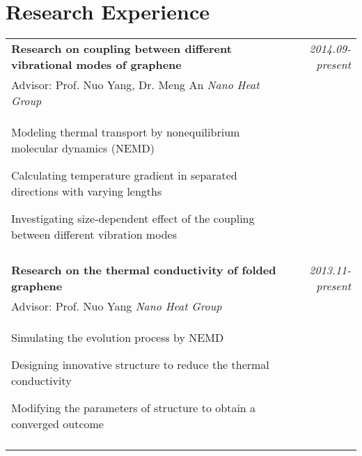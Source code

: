 \documentclass[a4paper,10pt]{article}
\begin{document}
\section{Research Experience}
\begin{tabular}{p{14.5cm}r}
\textbf{Research on coupling between different vibrational modes of graphene} & \emph{2014.09-present} \\
\hspace{1em} Advisor: Prof. Nuo Yang, Dr. Meng An \hspace{3em} \emph{Nano Heat Group} & \vspace{-0.5em}\\
\begin{compactitem}
       \item Modeling thermal transport by nonequilibrium molecular dynamics (NEMD)\vspace{0.2em}
       \item Calculating temperature gradient in separated directions with varying lengths\vspace{0.2em}
       \item Investigating size-dependent effect of the coupling between different vibration modes\vspace{0.2em}
     \end{compactitem}&\vspace{-2.2em} \\
\multicolumn{2}{c}{} \\
\textbf{Research on the thermal conductivity of folded graphene} & \emph{2013.11-present} \\
\hspace{1em} Advisor: Prof. Nuo Yang \hspace{9em} \emph{Nano Heat Group} & \vspace{-0.5em}\\
\begin{compactitem}
       \item Simulating the evolution process by NEMD\vspace{0.2em}
       \item Designing innovative structure to reduce the thermal conductivity\vspace{0.2em}
       \item Modifying the parameters of structure to obtain a converged outcome
     \end{compactitem}&\vspace{-2.2em} \\
\multicolumn{2}{c}{} \\

\end{tabular}
\end{document}

